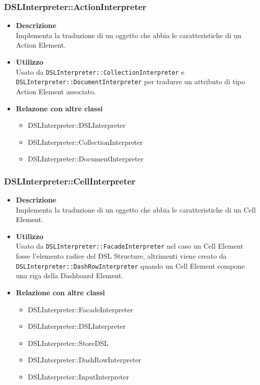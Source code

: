 \subsubsection{DSLInterpreter::ActionInterpreter}
\begin{itemize}
\item \textbf{Descrizione} \hfill \\
Implementa la traduzione di un oggetto che abbia le caratteristiche di un Action Element.
\item \textbf{Utilizzo} \hfill \\
Usato da \texttt{DSLInterpreter::CollectionInterpreter} e \texttt{DSLInterpreter::DocumentInterpreter} per tradurre un attributo di tipo Action Element associato.
\item \textbf{Relazone con altre classi}
\begin{itemize}
\item DSLInterpreter::DSLInterpreter
\item DSLInterpreter::CollectionInterpreter
\item DSLInterpreter::DocumentInterpreter
\end{itemize}
\end{itemize}

\subsubsection{DSLInterpreter::CellInterpreter}
\begin{itemize}
\item \textbf{Descrizione} \hfill \\
Implementa la traduzione di un oggetto che abbia le caratteristiche di un Cell Element.
\item \textbf{Utilizzo} \hfill \\
Usato da \texttt{DSLInterpreter::FacadeInterpreter} nel caso un Cell Element fosse l'elemento radice del DSL Structure, altrimenti viene creato da \texttt{DSLInterpreter::DashRowInterpreter} quando un Cell Element compone una riga della Dashboard Element.
\item \textbf{Relazione con altre classi}
\begin{itemize}
\item DSLInterpreter::FacadeInterpreter
\item DSLInterpreter::DSLInterpreter
\item DSLInterpreter::StoreDSL
\item DSLInterpreter::DashRowInterpreter
\item DSLInterpreter::InputInterpreter
\end{itemize}
\end{itemize}


